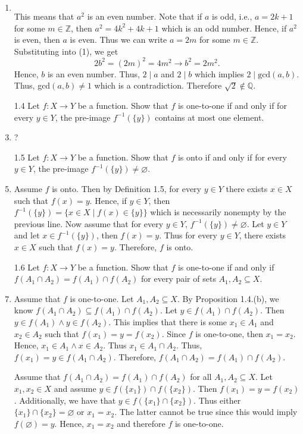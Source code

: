 \documentclass[12pt]{article}
\makeatletter
\theoremstyle{definition}
\theoremstyle{remark}
\renewenvironment{proof}[1][\proofname]{\par
  \pushQED{\qed}%
  \normalfont \topsep6\p@\@plus6\p@\relax
  \list{}{\leftmargin=0mm
          \rightmargin=4mm
          \settowidth{\itemindent}{\itshape#1}%
          \labelwidth=\itemindent
          \parsep=0pt \listparindent=\parindent 
  }
  \item[\hskip\labelsep
        \itshape
    #1\@addpunct{.}]\ignorespaces
}{%
  \popQED\endlist\@endpefalse
}
\let\oldproofname=\proofname
\renewcommand{\proofname}{\bf{\textit{\oldproofname}}}
\makeatother
\begin{document}
\begin{enumerate}[leftmargin=*]
\begin{proof}
\begin{equation}
                    \end{equation}
                This means that $a^2$ is an even number. Note that if $a$ is odd, i.e., $a=2k+1$ for some $m\in\mathbb{Z}$, then $a^2=4k^2+4k+1$ which is an odd number. Hence, if $a^2$ is even, then $a$ is even. Thus we can write $a=2m$ for some $m\in\mathbb{Z}$. Substituting into (1), we get
                    \begin{equation*}
                        2b^2=(2m)^2=4m^2\rightarrow b^2=2m^2.
                    \end{equation*}
                Hence, $b$ is an even number. Thus, $2\mid a$ and $2\mid b$ which implies $2\mid\text{gcd}(a,b)$. Thus, gcd$(a,b)\neq 1$ which is a contradiction. Therefore $\sqrt{2}\notin\mathbb{Q}$.
            \end{proof}
        \item[1.4] Let $f\colon X\rightarrow Y$ be a function. Show that $f$ is one-to-one if and only if for every $y\in Y$, the pre-image $f^{-1}(\{y\})$ contains at most one element.
            \begin{proof}
                ?
            \end{proof}
        \item[1.5] Let $f\colon X\rightarrow Y$ be a function. Show that $f$ is onto if and only if for every $y\in Y$, the pre-image $f^{-1}(\{y\})\neq\varnothing$.
            \begin{proof}
                Assume $f$ is onto. Then by Definition 1.5, for every $y\in Y$ there exists $x\in X$ such that $f(x)=y$. Hence, if $y\in Y$, then $f^{-1}(\{y\})=\{x\in X\mid f(x)\in\{y\}\}$ which is necessarily nonempty by the previous line. Now assume that for every $y\in Y$, $f^{-1}(\{y\})\neq\varnothing$. Let $y\in Y$ and let $x\in f^{-1}(\{y\})$, then $f(x)=y$. Thus for every $y\in Y$, there exists $x\in X$ such that $f(x)=y$. Therefore, $f$ is onto.
            \end{proof}
        \item[1.6] Let $f\colon X\rightarrow Y$ be a function. Show that $f$ is one-to-one if and only if $f(A_1\cap A_2)=f(A_1)\cap f(A_2)$ for every pair of sets $A_1,A_2\subseteq X$.
            \begin{proof}
                Assume that $f$ is one-to-one. Let $A_1,A_2\subseteq X$. By Proposition 1.4.(b), we know $f(A_1\cap A_2)\subseteq f(A_1)\cap f(A_2)$. Let $y\in f(A_1)\cap f(A_2)$. Then $y\in f(A_1)\land y\in f(A_2)$. This implies that there is some $x_1\in A_1$ and $x_2\in A_2$ such that $f(x_1)=y=f(x_2)$. Since $f$ is one-to-one, then $x_1=x_2$. Hence, $x_1\in A_1\land x\in A_2$. Thus $x_1\in A_1\cap A_2$. Thus, $f(x_1)=y\in f(A_1\cap A_2)$. Therefore, $f(A_1\cap A_2)=f(A_1)\cap f(A_2)$.\par\hspace{4mm} Assume that $f(A_1\cap A_2)=f(A_1)\cap f(A_2)$ for all $A_1,A_2\subseteq X$. Let $x_1,x_2\in X$ and assume $y\in f(\{x_1\})\cap f(\{x_2\})$. Then $f(x_1)=y=f(x_2)$. Additionally, we have that $y\in f(\{x_1\}\cap\{x_2\})$. Thus either $\{x_1\}\cap\{x_2\}=\varnothing$ or $x_1=x_2$. The latter cannot be true since this would imply $f(\varnothing)=y$. Hence, $x_1=x_2$ and therefore $f$ is one-to-one.

\end{proof}
\end{enumerate}
\end{document}
